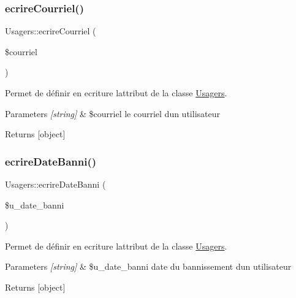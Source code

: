 \subsubsection{\texorpdfstring{ecrire\+Courriel()}{ecrireCourriel()}}
{\footnotesize\ttfamily Usagers\+::ecrire\+Courriel (\begin{DoxyParamCaption}\item[{}]{\$courriel }\end{DoxyParamCaption})}



Permet de définir en ecriture l\textquotesingle{}attribut de la classe \hyperlink{class_usagers}{Usagers}. 


\begin{DoxyParams}{Parameters}
{\em \mbox{[}string\mbox{]}} & \$courriel le courriel d\textquotesingle{}un utilisateur \\
\hline
\end{DoxyParams}
\begin{DoxyReturn}{Returns}
\mbox{[}object\mbox{]} 
\end{DoxyReturn}
\mbox{\label{class_usagers_a3ab662773095ba43de3b489ca7a84eb7}} 
\subsubsection{\texorpdfstring{ecrire\+Date\+Banni()}{ecrireDateBanni()}}
{\footnotesize\ttfamily Usagers\+::ecrire\+Date\+Banni (\begin{DoxyParamCaption}\item[{}]{\$u\+\_\+date\+\_\+banni }\end{DoxyParamCaption})}



Permet de définir en ecriture l\textquotesingle{}attribut de la classe \hyperlink{class_usagers}{Usagers}. 


\begin{DoxyParams}{Parameters}
{\em \mbox{[}string\mbox{]}} & \$u\+\_\+date\+\_\+banni date du bannissement d\textquotesingle{}un utilisateur \\
\hline
\end{DoxyParams}
\begin{DoxyReturn}{Returns}
\mbox{[}object\mbox{]} 
\end{DoxyReturn}
\mbox{\label{class_usagers_a9235e41e58d7e7c328d1fa534a13c56a}} 
